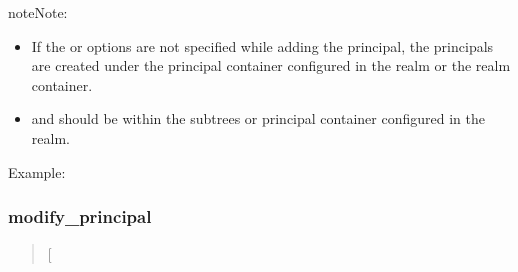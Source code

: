 \documentclass[letterpaper,10pt,english]{sphinxmanual}
\begin{document}
\begin{description}
\begin{sphinxadmonition}{note}{Note:}
\begin{itemize}
\item {} 
If the  or  options are not specified while
adding the principal, the principals are created under the
principal container configured in the realm or the realm
container.

\item {} 
 and  should be within the subtrees or
principal container configured in the realm.

\end{itemize}
\end{sphinxadmonition}

\end{description}

Example:

%
\begin{sphinxVerbatim}[commandchars=\\\{\}]
  
    
   
    
    
  
\end{sphinxVerbatim}
\label{\detokenize{admin/admin_commands/kadmin_local:add-principal-end}}

\subsubsection{modify\_principal}
\label{\detokenize{admin/admin_commands/kadmin_local:add-principal-end}}\label{\detokenize{admin/admin_commands/kadmin_local:id2}}\label{\detokenize{admin/admin_commands/kadmin_local:modify-principal}}\begin{quote}

 {[}\sphinxstyleemphasis{options}{]} 
\end{quote}
\end{document}
